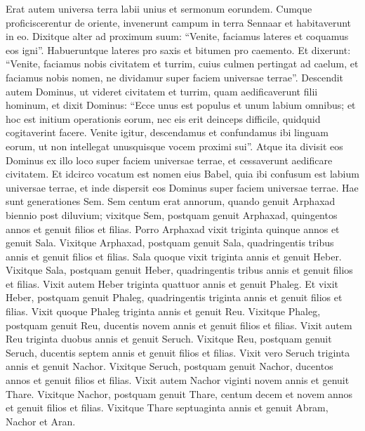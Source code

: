 \begin{biblechapter}  
\verse Erat autem universa terra labii unius et sermonum eorundem. 
\verse Cumque proficiscerentur de oriente, invenerunt campum in terra Sennaar et habitaverunt in eo. 
\verse Dixitque alter ad proximum suum: “Venite, faciamus lateres et coquamus eos igni”. Habueruntque lateres pro saxis et bitumen pro caemento.  
\verse Et dixerunt: “Venite, faciamus nobis civitatem et turrim, cuius culmen pertingat ad caelum, et faciamus nobis nomen, ne dividamur super faciem universae terrae”. 
\verse Descendit autem Dominus, ut videret civitatem et turrim, quam aedificaverunt filii hominum, 
\verse et dixit Dominus: “Ecce unus est populus et unum labium omnibus; et hoc est initium operationis eorum, nec eis erit deinceps difficile, quidquid cogitaverint facere. 
\verse Venite igitur, descendamus et confundamus ibi linguam eorum, ut non intellegat unusquisque vocem proximi sui”. 
\verse Atque ita divisit eos Dominus ex illo loco super faciem universae terrae, et cessaverunt aedificare civitatem. 
\verse Et idcirco vocatum est nomen eius Babel, quia ibi confusum est labium universae terrae, et inde dispersit eos Dominus super faciem universae terrae. 
\verse Hae sunt generationes Sem. Sem centum erat annorum, quando genuit Arphaxad biennio post diluvium; 
\verse vixitque Sem, postquam genuit Arphaxad, quingentos annos et genuit filios et filias. 
\verse Porro Arphaxad vixit triginta quinque annos et genuit Sala. 
\verse Vixitque Arphaxad, postquam genuit Sala, quadringentis tribus annis et genuit filios et filias.
\verse Sala quoque vixit triginta annis et genuit Heber. 
\verse Vixitque Sala, postquam genuit Heber, quadringentis tribus annis et genuit filios et filias.
\verse Vixit autem Heber triginta quattuor annis et genuit Phaleg. 
\verse Et vixit Heber, postquam genuit Phaleg, quadringentis triginta annis et genuit filios et filias.
\verse Vixit quoque Phaleg triginta annis et genuit Reu. 
\verse Vixitque Phaleg, postquam genuit Reu, ducentis novem annis et genuit filios et filias. 
\verse Vixit autem Reu triginta duobus annis et genuit Seruch. 
\verse Vixitque Reu, postquam genuit Seruch, ducentis septem annis et genuit filios et filias. 
\verse Vixit vero Seruch triginta annis et genuit Nachor. 
\verse Vixitque Seruch, postquam genuit Nachor, ducentos annos et genuit filios et filias. 
\verse Vixit autem Nachor viginti novem annis et genuit Thare. 
\verse Vixitque Nachor, postquam genuit Thare, centum decem et novem annos et genuit filios et filias. 
\verse Vixitque Thare septuaginta annis et genuit Abram, Nachor et Aran. 

\end{biblechapter}
